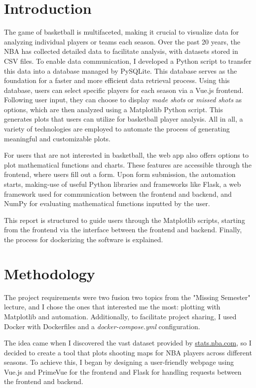\documentclass[sn-mathphys-num]{sn-jnl}%
\theoremstyle{thmstyleone}%
\theoremstyle{thmstyletwo}%
\theoremstyle{thmstylethree}%
\begin{document}
\section{Introduction}\label{sec1}

The game of basketball is multifaceted, making it crucial to visualize data for analyzing individual players or teams each season. Over the past 20 years, the NBA has collected detailed data to facilitate analysis, with datasets stored in CSV files. To enable data communication, I developed a Python script to transfer this data into a database managed by PySQLite. This database serves as the foundation for a faster and more efficient data retrieval process. Using this database, users can select specific players for each season via a Vue.js frontend. Following user input, they can choose to display \textit{made shots} or \textit{missed shots} as options, which are then analyzed using a Matplotlib Python script. This generates plots that users can utilize for basketball player analysis. All in all, a variety of technologies are employed to automate the process of generating meaningful and customizable plots.

For users that are not interested in basketball, the web app also offers options to plot mathematical functions and charts. These features are accessible through the frontend, where users fill out a form. Upon form submission, the automation starts, making-use of useful Python libraries and frameworks like Flask, a web framework used for communication between the frontend and backend, and NumPy for evaluating mathematical functions inputted by the user.

This report is structured to guide users through the Matplotlib scripts, starting from the frontend via the interface between the frontend and backend. Finally, the process for dockerizing the software is explained.

 

\section{Methodology}\label{sec2}

The project requirements were two fusion two topics from the "Missing Semester" lecture, and I chose the ones that interested me the most: plotting with Matplotlib and automation. Additionally, to facilitate project sharing, I used Docker with Dockerfiles and a \textit{docker-compose.yml} configuration.

The idea came when I discovered the vast dataset provided by \href{https://www.stats.nba.com}{stats.nba.com}, so I decided to create a tool that plots shooting maps for NBA players across different seasons. To achieve this, I began by designing a user-friendly webpage using Vue.js and PrimeVue for the frontend and Flask for handling requests between the frontend and backend.
\end{document}
